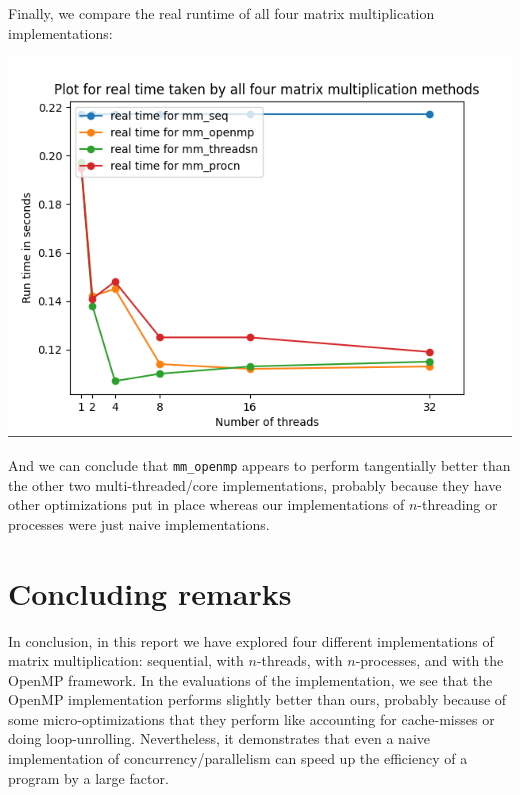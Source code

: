 \documentclass{article}
\begin{document}
Finally, we compare the real runtime of all four matrix multiplication implementations:\\
\begin{centering}
     \includegraphics[width=0.5\linewidth]{allrealtime.png}
\end{centering}

And we can conclude that \texttt{mm\_openmp} appears to perform tangentially better than the other two multi-threaded/core implementations, probably because they have other optimizations put in place whereas our implementations of $n$-threading or processes were just naive implementations.

\section{Concluding remarks}

In conclusion, in this report we have explored four different implementations of matrix multiplication: sequential, with $n$-threads, with $n$-processes, and with the OpenMP framework. In the evaluations of the implementation, we see that the OpenMP implementation performs slightly better than ours, probably because of some micro-optimizations that they perform like accounting for cache-misses or doing loop-unrolling. Nevertheless, it demonstrates that even a naive implementation of concurrency/parallelism can speed up the efficiency of a program by a large factor.
\end{document}
